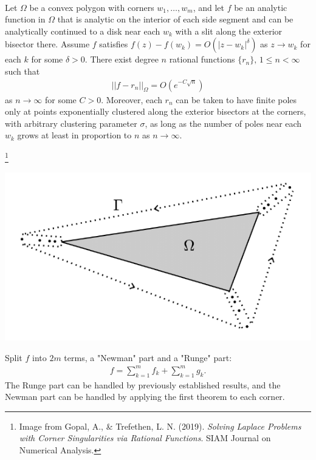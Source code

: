 \documentclass{seminar}
\begin{document}
\begin{slide} %
{} \small \\

Let $\Omega$ be a convex polygon with corners $w_1 , \ldots , w_m$, and let $f$ be an analytic function in $\Omega$ that is analytic on the interior of each side segment and can be analytically continued to a disk near each $w_k$ with a slit along the exterior bisector there. Assume $f$ satisfies $f(z)-f(w_k)=O(|z-w_k|^\delta)$ as $z \to w_k$ for each $k$ for some $\delta >0$. There exist degree $n$ rational functions $\{r_n\},\, 1 \leq n < \infty$ such that
	\begin{align*}
	||f-r_n||_\Omega=O(e^{-C\sqrt{n}})
	\end{align*}
as $n\to \infty$ for some $C>0$. Moreover, each $r_n$ can be taken to have finite poles only at points exponentially clustered along the exterior bisectors at the corners, with arbitrary clustering parameter $\sigma$, as long as the number of poles near each $w_k$ grows at least in proportion to $n$ as $n\to \infty$.
\end{slide} %




\begin{slide} %
{}\footnote{Image from Gopal, A., \& Trefethen, L. N. (2019). \emph{Solving Laplace Problems with Corner Singularities via Rational Functions}. SIAM Journal on Numerical Analysis.} \small \\
\begin{center}
\includegraphics[scale=0.4]{./PNG/polygon_illust}
\end{center}
Split $f$ into $2m$ terms, a "Newman" part and a "Runge" part:
\begin{align*}
f=\sum_{k=1}^m f_k + \sum_{k=1}^m g_k.
\end{align*}
The Runge part can be handled by previously established results, and the Newman part can be handled by applying the first theorem to each corner.
\end{slide} %
\end{document}
